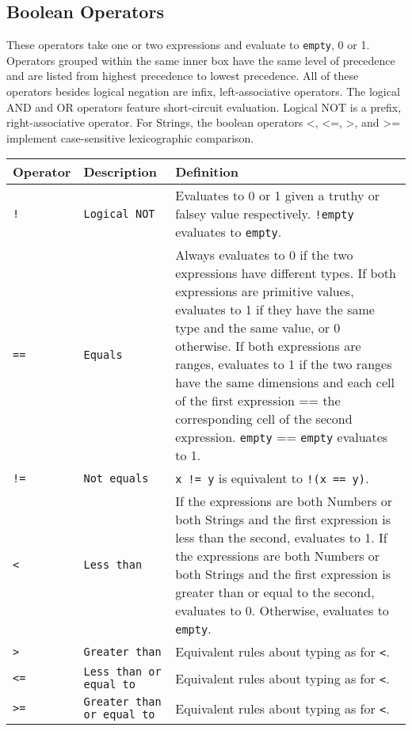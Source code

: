 		\subsection{Boolean Operators}
			These operators take one or two expressions and evaluate to \texttt{empty}, 0 or 1. Operators grouped within the same inner box have the same level of precedence and are listed from highest precedence to lowest precedence. All of these operators besides logical negation are infix, left-associative operators. The logical AND and OR operators feature short-circuit evaluation. Logical NOT is a prefix, right-associative operator. For Strings, the boolean operators <, <=, >, and >= implement case-sensitive lexicographic comparison.
			\begin{table}[H]
			\begin{tabular}{ |p{2cm}|p{5cm}|p{7cm}|  }
			\hline
			\textbf{Operator} & \textbf{Description} & \textbf{Definition} \\ \hline
			\rule{0pt}{3ex}\texttt{!} & \texttt{Logical NOT} & {Evaluates to 0 or 1 given a truthy or falsey value respectively. \texttt{!empty} evaluates to \texttt{empty}.} \\ \hline
			\rule{0pt}{3ex}\texttt{==} & \texttt{Equals} & {Always evaluates to 0 if the two expressions have different types. If both expressions are primitive values, evaluates to 1 if they have the same type and the same value, or 0 otherwise. If both expressions are ranges, evaluates to 1 if the two ranges have the same dimensions and each cell of the first expression == the corresponding cell of the second expression. \texttt{empty} == \texttt{empty} evaluates to 1.} \\
			\rule{0pt}{3ex}\texttt{!=} & \texttt{Not equals} & {\texttt{x != y} is equivalent to \texttt{!(x == y)}.} \\
			\rule{0pt}{3ex}\texttt{<} & \texttt{Less than} & {If the expressions are both Numbers or both Strings and the first expression is less than the second, evaluates to 1. If the expressions are both Numbers or both Strings and the first expression is greater than or equal to the second, evaluates to 0. Otherwise, evaluates to \texttt{empty}.} \\
			\rule{0pt}{3ex}\texttt{>} & \texttt{Greater than} & {Equivalent rules about typing as for \texttt{<}.} \\
			\rule{0pt}{3ex}\texttt{<=} & \texttt{Less than or equal to} & {Equivalent rules about typing as for \texttt{<}.} \\
			\rule{0pt}{3ex}\texttt{>=} & \texttt{Greater than or equal to} & {Equivalent rules about typing as for \texttt{<}.} \\ \hline

\end{tabular}
\end{table}
